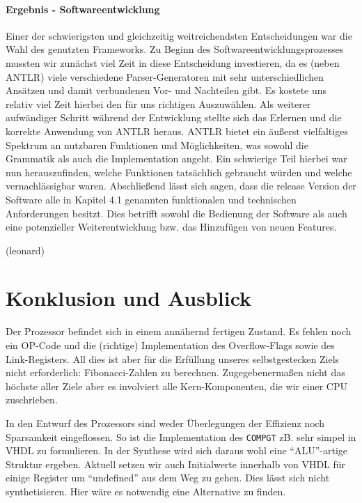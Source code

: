\documentclass[paper=a4,fontsize=12pt,twocolumn]{scrreprt}
\begin{document}
\subsubsection{Ergebnis - Softwareentwicklung}
Einer der schwierigsten und gleichzeitig weitreichendsten Entscheidungen war die Wahl des genutzten Frameworks. Zu Beginn des Softwareentwicklungsprozesses mussten wir zunächst viel Zeit in diese Entscheidung investieren, da es (neben ANTLR) viele verschiedene Parser-Generatoren mit sehr unterschiedlichen Ansätzen und damit verbundenen Vor- und Nachteilen gibt. Es kostete uns relativ viel Zeit hierbei den für uns richtigen Auszuwählen. %
Als weiterer aufwändiger Schritt während der Entwicklung stellte sich das Erlernen und die korrekte Anwendung von ANTLR heraus. ANTLR bietet ein äußerst vielfaltiges Spektrum an nutzbaren Funktionen und Möglichkeiten, was sowohl die Grammatik als auch die Implementation angeht. Ein schwierige Teil hierbei war nun herauszufinden, welche Funktionen tatsächlich gebraucht würden und welche vernachlässigbar waren. %
Abschließend lässt sich sagen, dass die release Version der Software alle in Kapitel 4.1 %
genannten funktionalen und technischen Anforderungen besitzt. Dies betrifft sowohl die Bedienung  der Software als auch eine potenzieller Weiterentwicklung bzw. das Hinzufügen von neuen Features. 

(leonard)


\chapter{Konklusion und Ausblick}


Der Prozessor befindet sich in einem annähernd fertigen Zustand.
Es fehlen noch ein OP-Code und die (richtige) Implementation des Overflow-Flags sowie des Link-Registers.
All dies ist aber für die Erfüllung unseres selbstgestecken Ziels nicht erforderlich: Fibonacci-Zahlen zu berechnen.
Zugegebenermaßen nicht das höchste aller Ziele aber es involviert alle Kern-Komponenten, die wir einer CPU zuschrieben.

In den Entwurf des Prozessors sind weder Überlegungen der Effizienz noch Sparsamkeit eingeflossen.
So ist die Implementation des \texttt{COMPGT} zB. sehr simpel in VHDL zu formulieren.
In der Synthese wird sich daraus wohl eine \enquote{ALU}-artige Struktur ergeben.
Aktuell setzen wir auch Initialwerte innerhalb von VHDL für einige Register um \enquote{undefined} aus dem Weg zu gehen.
Dies lässt sich nicht synthetisieren.
Hier wäre es notwendig eine Alternative zu finden.
\end{document}
